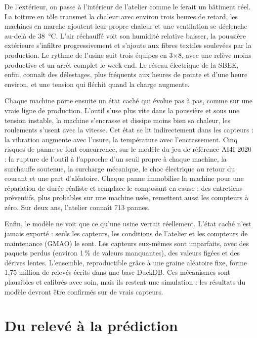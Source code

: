 \documentclass[11pt,a4paper]{article}
\begin{document}
De l'extérieur, on passe à l'intérieur de l'atelier comme le ferait un bâtiment réel. La toiture en tôle transmet la
chaleur avec environ trois heures de retard, les machines en marche ajoutent leur propre chaleur et une ventilation
se déclenche au-delà de 38~°C. L'air réchauffé voit son humidité relative baisser, la poussière extérieure s'infiltre
progressivement et s'ajoute aux fibres textiles soulevées par la production. Le rythme de l'usine suit trois équipes
en 3$\times$8, avec une relève moins productive et un arrêt complet le week-end. Le réseau électrique de la SBEE, enfin,
connaît des délestages, plus fréquents aux heures de pointe et d'une heure environ, et une tension qui fléchit quand
la charge augmente.

Chaque machine porte ensuite un état caché qui évolue pas à pas, comme sur une vraie ligne de production. L'outil
s'use plus vite dans la poussière et sous une tension instable, la machine s'encrasse et dissipe moins bien sa chaleur,
les roulements s'usent avec la vitesse. Cet état se lit indirectement dans les capteurs : la vibration augmente avec
l'usure, la température avec l'encrassement. Cinq risques de panne se font concurrence, sur le modèle du jeu de
référence AI4I 2020 : la rupture de l'outil à l'approche d'un seuil propre à chaque machine, la surchauffe soutenue,
la surcharge mécanique, le choc électrique au retour du courant et une part d'aléatoire. Chaque panne immobilise la
machine pour une réparation de durée réaliste et remplace le composant en cause ; des entretiens préventifs, plus
probables sur une machine usée, remettent aussi les compteurs à zéro. Sur deux ans, l'atelier connaît 713 pannes.

Enfin, le modèle ne voit que ce qu'une usine verrait réellement. L'état caché n'est jamais exporté : seuls les
capteurs, les conditions de l'atelier et les compteurs de maintenance (GMAO) le sont. Les capteurs eux-mêmes sont
imparfaits, avec des paquets perdus (environ 1\,\% de valeurs manquantes), des valeurs figées et des dérives lentes.
L'ensemble, reproductible grâce à une graine aléatoire fixe, forme 1,75 million de relevés écrits dans une base
DuckDB. Ces mécanismes sont plausibles et calibrés avec soin, mais ils restent une simulation : les résultats du modèle
devront être confirmés sur de vrais capteurs.

\section{Du relevé à la prédiction}
\end{document}
